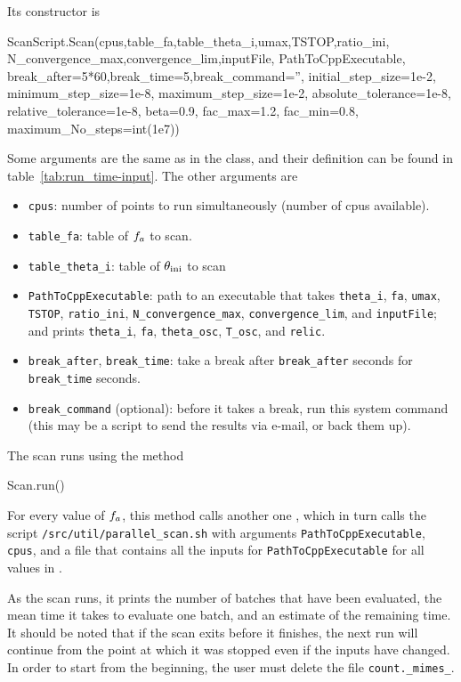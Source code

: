 \documentclass[11pt,a4paper]{article}
\begin{document}
Its constructor is
%
\begin{py}
	ScanScript.Scan(cpus,table_fa,table_theta_i,umax,TSTOP,ratio_ini,
					N_convergence_max,convergence_lim,inputFile,
					PathToCppExecutable, break_after=5*60,break_time=5,break_command='',
					initial_step_size=1e-2, minimum_step_size=1e-8, maximum_step_size=1e-2, 
					absolute_tolerance=1e-8, relative_tolerance=1e-8,
					beta=0.9, fac_max=1.2, fac_min=0.8, maximum_No_steps=int(1e7))
\end{py}
%
Some arguments are the same as in the  class, and their definition can be found in table~\ref{tab:run_time-input}. The other arguments are
%
\begin{itemize}
        \item {\tt cpus}: number of points to run simultaneously (number of cpus available). 
		\item {\tt table\_fa}: table of $f_{a}{}$ to scan.
		\item {\tt table\_theta\_i}: table of $\theta_{\rm ini}{}$ to scan
        \item {\tt PathToCppExecutable}: path to an executable that takes {\tt theta\_i},  {\tt fa},  {\tt umax},  {\tt TSTOP},  {\tt ratio\_ini}, {\tt N\_convergence\_max}, {\tt convergence\_lim}, and  {\tt inputFile}; and prints {\tt theta\_i}, {\tt fa}, {\tt theta\_osc}, {\tt T\_osc}, and {\tt relic}.
		\item {\tt break\_after}, {\tt break\_time}: take a break after {\tt break\_after} seconds for {\tt break\_time} seconds.
		\item {\tt break\_command} (optional): before it takes a break, run this system command (this may be a script to send the results
		via e-mail, or back them up).
\end{itemize}
%
The scan runs using the method
%
\begin{py}
	Scan.run()
\end{py} 
%
For every value of $f_{a}{}$, this method calls another one , which in turn calls the  script {\tt \mimes/src/util/parallel\_scan.sh} with arguments {\tt PathToCppExecutable}, {\tt cpus}, and a file that contains all the inputs for {\tt PathToCppExecutable} for all values in . 


As the scan runs, it prints the number of batches that have been evaluated, the mean time it takes to evaluate one batch, and an estimate of the remaining time. It should be noted that if the scan exits before it finishes, the next run will continue from the point at which it was stopped even if the inputs have changed. In order to start from the beginning, the user must delete the file {\tt count.\_mimes\_}.
\end{document}

